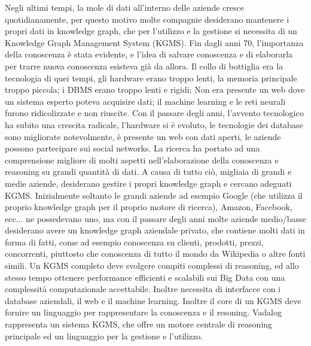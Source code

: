 Negli ultimi tempi, la mole di dati all'interno delle aziende cresce quotidianamente, per questo motivo molte compagnie desiderano mantenere i propri dati in knowledge graph, che per l'utilizzo e la gestione si necessita di un Knowledge Graph Management System (KGMS). \newline
Fin dagli anni 70, l'importanza della conoscenza \`e stata evidente, e l'idea di salvare conoscenza e di elaborarla per trarre nuova conoscenza esisteva gi\`a da allora. Il collo di bottiglia era la tecnologia di quei tempi, gli hardware erano troppo lenti, la memoria principale troppo piccola; i DBMS erano troppo lenti e rigidi; Non era presente un web dove un sistema esperto poteva acquisire dati; il machine learning e le reti neurali furono ridicolizzate e non riuscite.\newline
Con il passare degli anni, l'avvento tecnologico ha subito una crescita radicale, l'hardware si \`e evoluto, le tecnologie dei database sono migliorate notevolmente, \`e presente un web con dati aperti, le aziende possono partecipare sui social networks. La ricerca ha portato ad una comprensione migliore di molti aspetti nell'elaborazione della conoscenza e reasoning su grandi quantit\`a di dati.\newline
A causa di tutto ci\`o, migliaia di grandi e medie aziende, desiderano gestire i propri knowledge graph e cercano adeguati KGMS. Inizialmente soltanto le grandi aziende ad esempio Google (che utilizza il proprio knowledge graph per il proprio motore di ricerca), Amazon, Facebook, ecc... ne possedevano uno, ma con il passare degli anni molte aziende medio/basse desiderano avere un knowledge graph aziendale privato, che contiene molti dati in forma di fatti, come ad esempio conoscenza su clienti, prodotti, prezzi, concorrenti, piuttosto che conoscenza di tutto il mondo da Wikipedia o altre fonti simili.\newline
Un KGMS completo deve svolgere compiti complessi di reasoning, ed allo stesso tempo ottenere performance efficienti e scalabili sui Big Data con una complessit\`a computazionale accettabile. Inoltre necessita di interfacce con i database aziendali, il web e il machine learning. Inoltre il core di un KGMS deve fornire un linguaggio per rappresentare la conoscenza e il resoning.\newline \newline
Vadalog rappresenta un sistema KGMS, che offre un motore centrale di reasoning principale ed un linguaggio per la gestione e l'utilizzo.\newline
